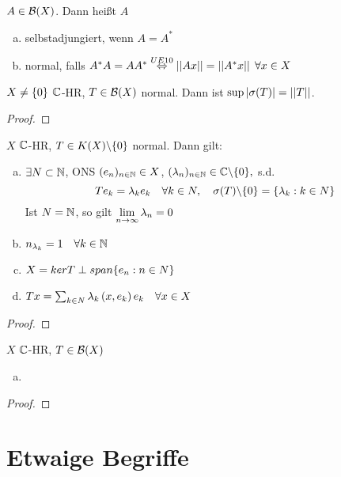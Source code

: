\documentclass[ngerman]{report}
\begin{document}
	\begin{definition}
		$A \in \BS[X]$. Dann heißt $A$ 
			\begin{enumerate}[a)]
				\item selbstadjungiert, wenn $A = A^*$
				\item normal, falls $A^* A = A A^* \aq[UE10] \norm{Ax} = \norm{A^* x} \; \forall x \in X$ 
			\end{enumerate}
	\end{definition}
	
	\begin{lemma}
		$X \neq \set{0}$ $\C$-HR, $T\in \BS[X]$ normal. Dann ist $\sup|\sigma(T)| = \norm{T}$.
	\end{lemma}

	\begin{proof}
		\todor	
	\end{proof}

		
	\begin{thm}
		$X$ $\C$-HR, $T\in K(X)\backslash\set{0}$ normal. Dann gilt:
			\begin{enumerate}[a)]
				\item $\exists N\subset \N$, ONS $\ff{e}{n}{\N} \in X$, $\ff{\lambda}{n}{\N}\in \C\backslash\set{0},$ s.d. 
				$$ T e_k = \lambda_k e_k \quad \forall k\in N, \quad \sigma(T)\backslash\set{0} = \set{\lambda_k: k \in N}$$
				Ist $N = \N$, so gilt $\disp \limes \lambda_n = 0$
				\item $n_{\lambda_k} = 1 \quad \forall k\in\N$
				\item $X = ker T \perp span\set{e_n : n\in N}$
				\item $Tx = \sum_{k\in N} \lambda_k \Sp{x,e_k} e_k \quad \forall x \in X$
			\end{enumerate}
	\end{thm}
	
	\begin{proof}
		\todor	
	\end{proof}

	\begin{bem}
	  $X$ $\C$-HR, $T\in\BS[X]$	
			\begin{enumerate}[a)]
				\item  \todor[Bemerkung]
			\end{enumerate}
	\end{bem}
	
	\begin{proof}
		\todor	
	\end{proof}
\newpage

\appendix 

\chapter{Etwaige Begriffe}
\glsaddall

\printnoidxglossary


\end{document}
